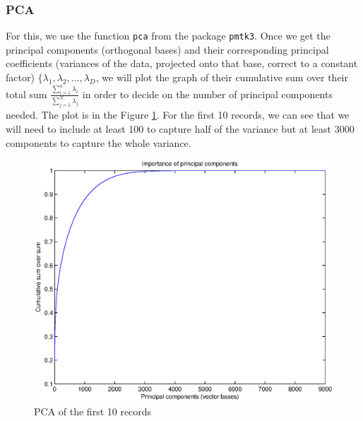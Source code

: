 \subsubsection{PCA}
	For this, we use the function \verb!pca! from the package \verb!pmtk3!. Once we get the principal components (orthogonal bases) and their corresponding principal coefficients (variances of the data, projected onto that base, correct to a constant factor) $\{\lambda_1, \lambda_2, \dotsc, \lambda_D$, we will plot the graph of their cumulative sum over their total sum $\frac{\sum_{i = 1}^n \lambda_i}{\sum_{j = 1}^N \lambda_j}$ in order to decide on the number of principal components needed. The plot is in the Figure \ref{fig:visualisePca}. For the first 10 records, we can see that we will need to include at least 100 to capture half of the variance but at least 3000 components to capture the whole variance.

	\begin{figure}[ht!]
		\centering
			\includegraphics{drawings/visualisePca.eps}
		\caption{PCA of the first 10 records}
		\label{fig:visualisePca}
	\end{figure}